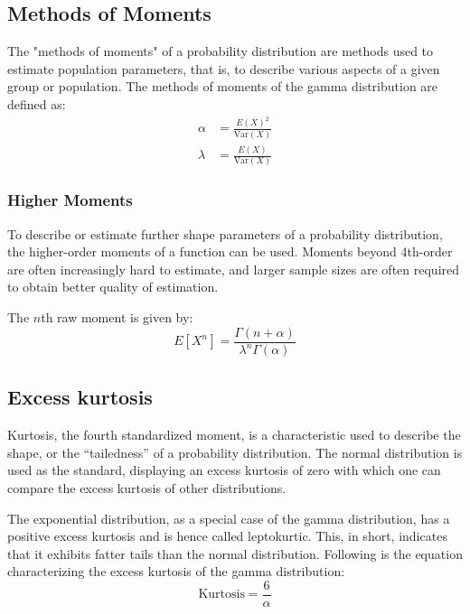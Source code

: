 \documentclass[12pt]{article}
\begin{document}
\subsection{Methods of Moments}
The "methods of moments" of a probability distribution are methods used to estimate population parameters, that is, to
describe various aspects of a given group or population. The methods of moments of the gamma distribution are defined
as\cite{wikipediaMethodMomentsStatistics2021, limWhatPopulationParameter2019}:
\begin{equation}
	\begin{split}
		\alpha	&=	\frac{E(X)^2}{\text{Var}(X)}\\
		\lambda	&=	\frac{E(X)}{\text{Var}(X)}
	\end{split}
\end{equation}

\subsubsection{Higher Moments}
To describe or estimate further shape parameters of a probability distribution, the higher-order moments of a function
can be used. Moments beyond 4th-order are often increasingly hard to estimate, and larger sample sizes are often
required to obtain better quality of estimation\cite{wikipediaMomentMathematics2022}.

The $n$th raw moment is given by:
\begin{equation}
	E[X^n] = \frac{\Gamma(n+\alpha)}{\lambda^n\Gamma(\alpha)}
\end{equation}

\subsection{Excess kurtosis}
Kurtosis, the fourth standardized moment, is a characteristic used to describe the shape, or the “tailedness” of a
probability distribution. The normal distribution is used as the standard, displaying an excess kurtosis of zero with
which one can compare the excess kurtosis of other distributions\cite{wikipediaKurtosis2022}.

The exponential distribution, as a special case of the gamma distribution, has a positive excess kurtosis and is hence
called leptokurtic. This, in short, indicates that it exhibits fatter tails than the normal distribution. Following is
the equation characterizing the excess kurtosis of the gamma distribution\cite{wikipediaKurtosis2022}:
\begin{equation}
	\text{Kurtosis} = \frac{6}{\alpha}
\end{equation}
\end{document}
